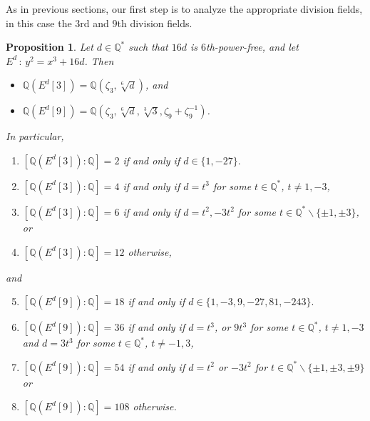 \documentclass[11pt]{amsart}
\newtheorem{proposition}[defn]{Proposition}
\theoremstyle{definition}
\newcommand{\Q}{\mathbb Q}
\begin{document}
As in previous sections, our first step is to analyze the appropriate division fields, in this case the $3$rd and $9$th division fields.

\begin{proposition}
\label{lem-3and9divfielddegreej0}
Let $d\in \Q^*$ such that $16d$ is $6$th-power-free, and let $E^d\,:\,y^2=x^3+16 d$. Then
\begin{itemize}
\item  $\Q(E^d[3]) = \Q(\zeta_3,\sqrt[6]{d})$, and
\item  $\Q(E^d[9]) = \Q(\zeta_3,\sqrt[6]{d},\sqrt[3]{3},\zeta_9+\zeta_9^{-1})$.
\end{itemize}
In particular,
    \begin{enumerate}
        \item $[\Q(E^d[3]):\Q]=2$ if and only if $d\in \{1, -27 \}.$
        \item $[\Q(E^d[3]):\Q]=4$ if and only if $d =  t^3$ for some $t \in \Q^*$, $t\ne 1,-3$,
        \item $[\Q(E^d[3]) : \Q]= 6$ if and only if $d=t^2, -3t^2$ for some $t \in \Q^*\smallsetminus\{\pm 1,\pm 3\}$, or
        \item $[\Q(E^d[3]) : \Q] = 12$ otherwise,
    \end{enumerate}
    and
    \begin{enumerate}\setcounter{enumi}{4}
        \item $[\Q(E^d[9]):\Q]=18$ if and only if $d\in \{1, -3, 9, -27, 81, -243 \}.$
        \item $[\Q(E^d[9]):\Q]=36$ if and only if $d = t^3$, or $9t^3$ for some $t \in \Q^*$, $t\ne 1,-3$ and $d = 3 t^3$ for some $t \in \Q^*$, $t\ne -1,3$,
        \item $[\Q(E^d[9]) : \Q]= 54$ if and only if $d = t^2$ or $-3t^2$ for $t \in \Q^* \smallsetminus \{\pm 1, \pm 3, \pm 9\}$ or
        \item $[\Q(E^d[9]) : \Q] = 108$ otherwise.
    \end{enumerate}
\end{proposition}
\end{document}
